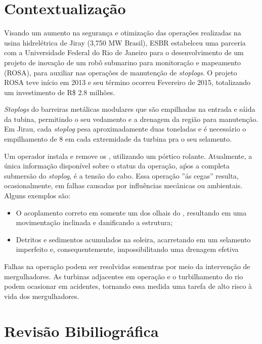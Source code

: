 \chapter*{Contextualização}
Visando um aumento na segurança e otimização das operações realizadas na usina 
hidrelétrica de Jiray (3,750 MW Brasil), ESBR estabelceu uma parceria com a 
Universidade Federal do Rio de Janeiro para o desenvolvimento de um projeto de 
inovação de um robô submarino para monitoração e mapeamento (ROSA), para auxiliar
nas operações de manutenção de \textit{stoplogs}. O projeto ROSA teve início em
2013 e seu término ocorreu Fevereiro de 2015, totalizando um investimento de
R\$ 2.8 milhões.

\textit{Stoplogs} do barreiras metálicas modulares que são empilhadas na entrada
e sáida da tubina, permitindo o seu vedamento e a drenagem da região para
manutenção. Em Jirau, cada \textit{stoplog} pesa aproximadamente duas toneladas
e é necessário o empilhamento de 8  em cada extremidade da turbina
pra o seu selamento.

Um operador instala e remove os , utilizando um pórtico
rolante. Atualmente, a única informação disponível sobre o status da operação,
aṕos a completa submersão do \textit{stoplog}, é a tensão do cabo. Essa operação
''ás cegas'' resulta, ocasionalmente, em falhas causadas por influências
mecânicas ou ambientais. Alguns exemplos são:

\begin{itemize}
  \item O acoplamento correto em somente um dos olhais do ,
  resultando em uma movimentação inclinada e danificando a estrutura;
  \item Detritos e sedimentos acumulados na soleira, acarretando em um selamento
  imperfeito e, consequentemente, impossibilitando uma drenagem efetiva
\end{itemize}

Falhas na operação podem ser resolvidas somentras por meio da intervenção de
mergulhadores. As turbinas adjacentes em operação e o turbilhamento do rio podem
ocasionar em acidentes, tornando essa medida uma tarefa de alto risco à vida dos
mergulhadores.

\chapter*{Revisão Bibiliográfica}

